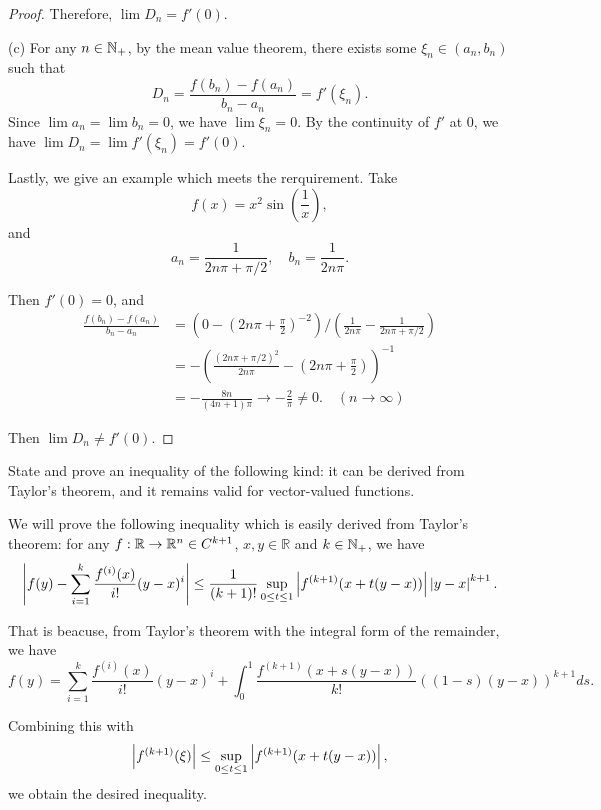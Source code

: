 \documentclass{article}
\begin{document}
\begin{proof}
  Therefore, \( \lim D_n=f'(0) \). \par
  (c) For any \( n\in\mathbb{N}_+ \), by the mean value theorem, there exists some \( \xi_n\in(a_n,b_n) \) such that
  \[ D_n=\frac{f(b_n)-f(a_n)}{b_n-a_n}=f'(\xi_n). \]
  Since \( \lim a_n=\lim b_n=0 \), we have \( \lim \xi_n=0 \). By the continuity of \( f' \) at 0, we have \( \lim D_n=\lim f'(\xi_n)=f'(0) \).\par
  Lastly, we give an example which meets the rerquirement. Take
  \[ f(x)=x^2\sin\left( \frac{1}{x} \right), \]
  and
  \[ a_n=\frac{1}{2n\pi+\pi/2}, \quad b_n=\frac{1}{2n\pi}. \]\par
  Then \( f'(0)=0 \), and
  \begin{align*}
    \frac{f(b_n)-f(a_n)}{b_n-a_n}
    &=\left( 0-\left( 2n\pi+\frac{\pi}{2} \right)^{-2} \right)/\left( \frac{1}{2n\pi}- \frac{1}{2n\pi+\pi/2} \right)\\
    &=-\left( \frac{(2n\pi+\pi/2)^2}{2n\pi}-\left( 2n\pi+\frac{\pi}{2} \right) \right)^{-1}\\
    &=-\frac{8n}{(4n+1)\pi}\to -\frac{2}{\pi}\neq 0.\quad (n\to\infty)
  \end{align*}\par
  Then \( \lim D_n\neq f'(0) \).
\end{proof}




\begin{problem}[5-20]
State and prove an inequality of the following kind: it can be derived from Taylor's theorem, and it remains valid for vector-valued functions.
\end{problem}

\begin{solution}
  We will prove the following inequality which is easily derived from Taylor's theorem: for any \( f:\mathbb{R}\to\mathbb{R}^n\in C^{k+1} \), \( x,y\in\mathbb{R} \) and \( k\in\mathbb{N}_+ \), we have
  \[ \left|f(y)-\sum_{i=1}^{k}\frac{f^{(i)}(x)}{i!}(y-x)^i\right|
  \le\frac{1}{(k+1)!}\sup_{0\le t\le 1} \left|f^{(k+1)}(x+t(y-x))\right|\left|y-x\right|^{k+1}. \]\par
  That is beacuse, from Taylor's theorem with the integral form of the remainder, we have
  \[ f(y)=\sum_{i=1}^{k}\frac{f^{(i)}(x)}{i!}(y-x)^i+\int_0^1 \frac{f^{(k+1)}(x+s(y-x))}{k!}((1-s)(y-x))^{k+1} ds. \]\par
  Combining this with
  \[ \left|f^{(k+1)}(\xi)\right|\le\sup_{0\le t\le 1} \left|f^{(k+1)}(x+t(y-x))\right|, \]
  we obtain the desired inequality.
\end{solution}
\end{document}
